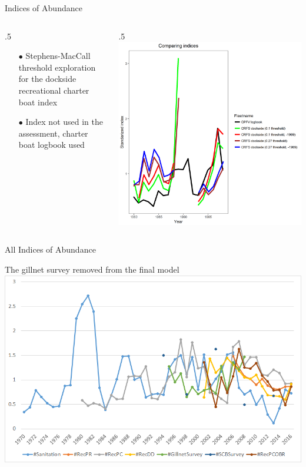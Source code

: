 \documentclass[ignorenonframetext,]{beamer}
\def\begincols{\begin{columns}}
\def\begincol{\begin{column}}
\def\endcol{\end{column}}
\def\endcols{\end{columns}}
\begin{document}
\begin{frame}{Indices of Abundance}

\begincols
 \begincol{.5\textwidth}

\begin{itemize}
\item[$\bullet$] Stephens-MacCall threshold exploration for the dockside recreational charter boat index
\item[$\bullet$] Index not used in the assessment, charter boat logbook used
\end{itemize}

\endcol
 \begincol{.5\textwidth}
\includegraphics{Figures/Fleet5_RecPC_dockside_index_compare.png}
\endcol
\endcols

\end{frame}

\begin{frame}{All Indices of Abundance}

The gillnet survey removed from the final model
\includegraphics{Figures/All_indices.png}

\end{frame}
\end{document}
